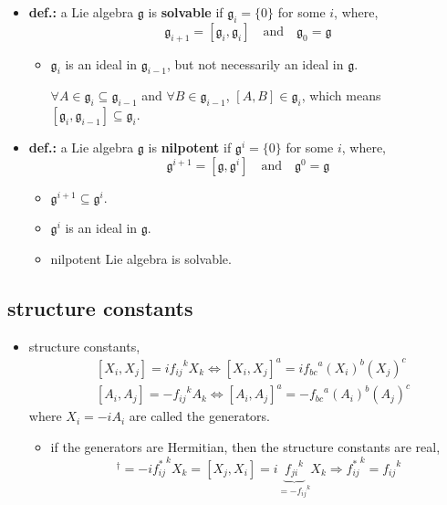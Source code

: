 \begin{itemize}
	\item \textbf{def.:} a Lie algebra $\mathfrak{g}$ is \textbf{solvable} if $\mathfrak{g}_i = \{0\}$ for some $i$, where,
	\begin{equation}
		\mathfrak{g}_{i + 1} = [\mathfrak{g}_i, \mathfrak{g}_i] \quad \text{and} \quad \mathfrak{g}_0 = \mathfrak{g}
	\end{equation}
	\begin{itemize}
		\item $\mathfrak{g}_i$ is an ideal in $\mathfrak{g}_{i - 1}$, but not necessarily an ideal in $\mathfrak{g}$.
		
		\begin{tcolorbox}[title=proof:]
			$\forall A \in \mathfrak{g}_i \subseteq \mathfrak{g}_{i - 1}$ and $\forall B \in \mathfrak{g}_{i - 1}$, $[A, B] \in \mathfrak{g}_i$, which means $[\mathfrak{g}_i, \mathfrak{g}_{i - 1}] \subseteq \mathfrak{g}_i$.
		\end{tcolorbox}
	\end{itemize}
	
	\item \textbf{def.:} a Lie algebra $\mathfrak{g}$ is \textbf{nilpotent} if $\mathfrak{g}^i = \{0\}$ for some $i$, where,
	\begin{equation}
		\mathfrak{g}^{i + 1} = [\mathfrak{g}, \mathfrak{g}^i] \quad \text{and} \quad \mathfrak{g}^0 = \mathfrak{g}
	\end{equation}
	\begin{itemize}
		\item $\mathfrak{g}^{i + 1} \subseteq \mathfrak{g}^i$.
		
		\item $\mathfrak{g}^i$ is an ideal in $\mathfrak{g}$.
		
		\item nilpotent Lie algebra is solvable.
	\end{itemize}
\end{itemize}

\subsection{structure constants}
\begin{itemize}
	\item structure constants,
	\begin{align}
		& [X_i, X_j] = i {f_{i j}}^k X_k \iff [X_i, X_j]^a = i {f_{b c}}^a (X_i)^b (X_j)^c \\
		& [A_i, A_j] = - {f_{i j}}^k A_k \iff [A_i, A_j]^a = - {f_{b c}}^a (A_i)^b (A_j)^c
	\end{align}
	where $X_i = - i A_i$ are called the generators.
	\begin{itemize}
		\item if the generators are Hermitian, then the structure constants are real,
		\begin{equation}
			[X_i, X_j]^\dag = - i {f^*_{i j}}^k X_k = [X_j, X_i] = i \underbrace{{f_{j i}}^k}_{= - {f_{i j}}^k} X_k \Longrightarrow {f^*_{i j}}^k = {f_{i j}}^k
		\end{equation}
	\end{itemize}
\end{itemize}
